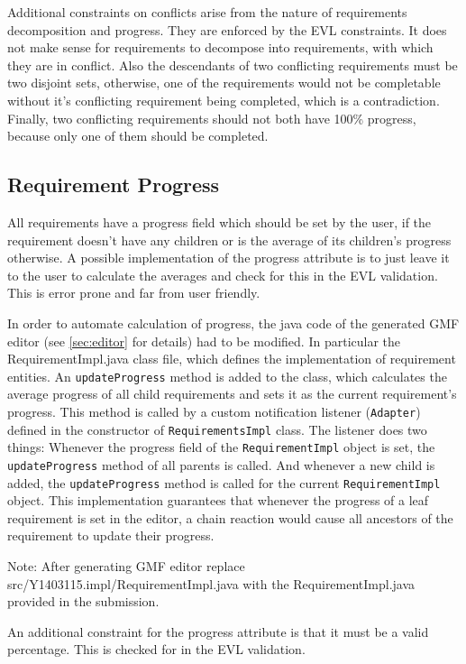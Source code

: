 \documentclass[11pt,a4paper]{article}
\begin{document}
	Additional constraints on conflicts arise from the nature of requirements decomposition and progress. They are enforced by the EVL constraints. It does not make sense for requirements to decompose into requirements, with which they are in conflict. Also the descendants of two conflicting requirements must be two disjoint sets, otherwise, one of the requirements would not be completable without it's conflicting requirement being completed, which is a contradiction. Finally, two conflicting requirements should not both have 100\% progress, because only one of them should be completed.
	
	\subsection{Requirement Progress} \label{sec:progress}
	All requirements have a progress field which should be set by the user, if the requirement doesn't have any children or is the average of its children's progress otherwise. A possible implementation of the progress attribute is to just leave it to the user to calculate the averages and check for this in the EVL validation. This is error prone and far from user friendly. 
	
	In order to automate calculation of progress, the java code of the generated GMF editor (see \autoref{sec:editor} for details) had to be modified. In particular the RequirementImpl.java class file, which defines the implementation of requirement entities. An \texttt{updateProgress} method is added to the class, which calculates the average progress of all child requirements and sets it as the current requirement's progress. This method is called by a custom notification listener (\texttt{Adapter}) defined in the constructor of \texttt{RequirementsImpl} class. The listener does two things: Whenever the progress field of the \texttt{RequirementImpl} object is set, the \texttt{updateProgress} method of all parents is called. And whenever a new child is added, the \texttt{updateProgress} method is called for the current \texttt{RequirementImpl} object. This implementation guarantees that whenever the progress of a leaf requirement is set in the editor, a chain reaction would cause all ancestors of the requirement to update their progress.
	
	Note: After generating GMF editor replace src/Y1403115.impl/RequirementImpl.java with the RequirementImpl.java provided in the submission.

	An additional constraint for the progress attribute is that it must be a valid percentage. This is checked for in the EVL validation.
	
\end{document}

